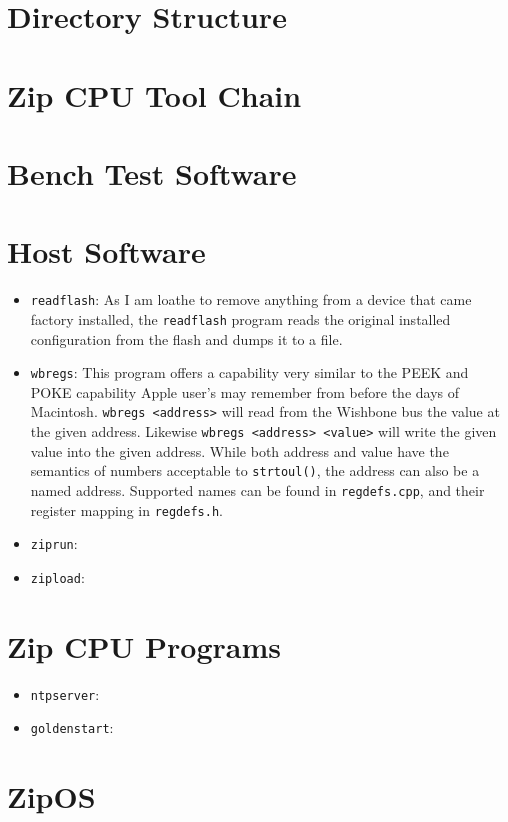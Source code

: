 \documentclass{gqtekspec}
\begin{document}
\section{Directory Structure}
\section{Zip CPU Tool Chain}
\section{Bench Test Software}
\section{Host Software}
\begin{itemize}
\item {\tt readflash}: As I am loathe to remove anything from
	a device that came factory installed, the
	{\tt readflash} program reads the original installed
	configuration from the flash and dumps it to a file.

\item {\tt wbregs}: This program offers a capability very similar to the 
	PEEK and POKE capability Apple user's may remember from before the
	days of Macintosh.  {\tt wbregs <address>} will read from the
	Wishbone bus the value at the given address.  Likewise
	{\tt wbregs <address> <value>} will write the given value into the
	given address.  While both address and value have the semantics of
	numbers acceptable to {\tt strtoul()}, the address can also be a named
	address.  Supported names can be found in {\tt regdefs.cpp}, and their
	register mapping in {\tt regdefs.h}.
\item {\tt ziprun}:
\item {\tt zipload}:
\end{itemize}

\section{Zip CPU Programs}
\begin{itemize}
\item {\tt ntpserver}:
\item {\tt goldenstart}:
\end{itemize}
\section{ZipOS}
\end{document}
